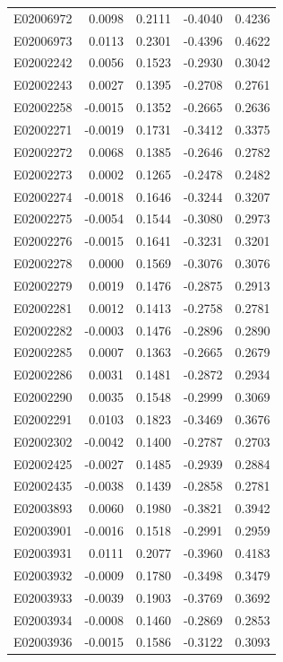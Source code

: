 \documentclass[11pt, a4paper]{article}
\begin{document}
\begin{longtable}{lrrrr}
E02006972 & 0.0098 & 0.2111 & -0.4040 & 0.4236 \\
E02006973 & 0.0113 & 0.2301 & -0.4396 & 0.4622 \\
E02002242 & 0.0056 & 0.1523 & -0.2930 & 0.3042 \\
E02002243 & 0.0027 & 0.1395 & -0.2708 & 0.2761 \\
E02002258 & -0.0015 & 0.1352 & -0.2665 & 0.2636 \\
E02002271 & -0.0019 & 0.1731 & -0.3412 & 0.3375 \\
E02002272 & 0.0068 & 0.1385 & -0.2646 & 0.2782 \\
E02002273 & 0.0002 & 0.1265 & -0.2478 & 0.2482 \\
E02002274 & -0.0018 & 0.1646 & -0.3244 & 0.3207 \\
E02002275 & -0.0054 & 0.1544 & -0.3080 & 0.2973 \\
E02002276 & -0.0015 & 0.1641 & -0.3231 & 0.3201 \\
E02002278 & 0.0000 & 0.1569 & -0.3076 & 0.3076 \\
E02002279 & 0.0019 & 0.1476 & -0.2875 & 0.2913 \\
E02002281 & 0.0012 & 0.1413 & -0.2758 & 0.2781 \\
E02002282 & -0.0003 & 0.1476 & -0.2896 & 0.2890 \\
E02002285 & 0.0007 & 0.1363 & -0.2665 & 0.2679 \\
E02002286 & 0.0031 & 0.1481 & -0.2872 & 0.2934 \\
E02002290 & 0.0035 & 0.1548 & -0.2999 & 0.3069 \\
E02002291 & 0.0103 & 0.1823 & -0.3469 & 0.3676 \\
E02002302 & -0.0042 & 0.1400 & -0.2787 & 0.2703 \\
E02002425 & -0.0027 & 0.1485 & -0.2939 & 0.2884 \\
E02002435 & -0.0038 & 0.1439 & -0.2858 & 0.2781 \\
E02003893 & 0.0060 & 0.1980 & -0.3821 & 0.3942 \\
E02003901 & -0.0016 & 0.1518 & -0.2991 & 0.2959 \\
E02003931 & 0.0111 & 0.2077 & -0.3960 & 0.4183 \\
E02003932 & -0.0009 & 0.1780 & -0.3498 & 0.3479 \\
E02003933 & -0.0039 & 0.1903 & -0.3769 & 0.3692 \\
E02003934 & -0.0008 & 0.1460 & -0.2869 & 0.2853 \\
E02003936 & -0.0015 & 0.1586 & -0.3122 & 0.3093 \\

\end{longtable}
\end{document}
